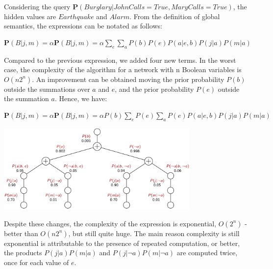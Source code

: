 Considering the query $\mathbf{P}(Burglary|JohnCalls=True, MaryCalls=True)$, the hidden values are $Earthquake$ and $Alarm$. From the definition of global semantics, the expressions
can be notated as follows:
\begin{center}
    $\mathbf{P}(B|j, m) = \alpha \mathbf{P}(B|j, m) = \alpha \sum_{e}\sum_{a}P(b)P(e)P(a|e, b)P(j|a)P(m|a)$
\end{center}
Compared to the previous expression, we added four new terms. In the worst case, the complexity of the algorithm for a network with n Boolean variables is $O(n2^n)$. 
An improvement can be obtained moving the prior probability $P(b)$ outside the summations over $a$ and $e$, and the prior probability $P(e)$ outside the summation $a$.
Hence, we have:
\begin{center}
    $\mathbf{P}(B|j, m) = \alpha \mathbf{P}(B|j, m) = \alpha P(b)\sum_{e}P(e)\sum_{a}P(e)P(a|e, b)P(j|a)P(m|a)$ \vspace{3.5pt}
    
    \includegraphics[width=0.75\textwidth]{img/img12.png}
\end{center} \vspace{3.5pt}
Despite these changes, the complexity of the expression is exponential, $O(2^n)$ - better than $O(n2^n)$, but still quite huge. The main reason complexity is still exponential
is attributable to the presence of repeated computation, or better, the products $P(j|a)P(m|a)$ and $P(j|\neg a)P(m|\neg a)$ are computed twice, once for each value of $e$.